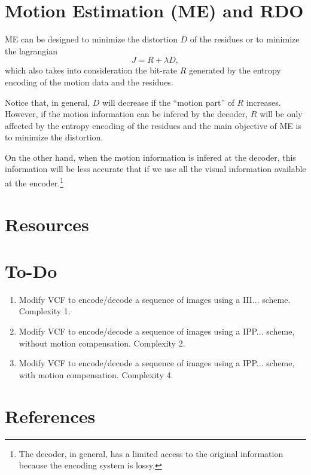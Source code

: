 
\section{Motion Estimation (ME) and RDO}

ME can be designed to minimize the distortion $D$ of the residues or
to minimize the lagrangian
\begin{equation}
  J = R + \lambda D,
\end{equation}
which also takes into consideration the bit-rate $R$ generated by the
entropy encoding of the motion data and the residues.

Notice that, in general, $D$ will decrease if the ``motion part'' of
$R$ increases. However, if the motion information can be infered by
the decoder, $R$ will be only affected by the entropy encoding of the
residues and the main objective of ME is to minimize the distortion.

On the other hand, when the motion information is infered at the
decoder, this information will be less accurate that if we use all the
visual information available at the encoder.\footnote{The decoder, in
general, has a limited access to the original information because the
encoding system is lossy.}


\section{Resources}

\section{To-Do}

\begin{enumerate}
\item Modify VCF to encode/decode a sequence of images using a
  III... scheme. Complexity 1.
\item Modify VCF to encode/decode a sequence of images using a
  IPP... scheme, without motion compensation. Complexity 2.
\item Modify VCF to encode/decode a sequence of images using a
  IPP... scheme, with motion compensation. Complexity 4.
\end{enumerate}

  
\section{References}

\renewcommand{\addcontentsline}[3]{}%


